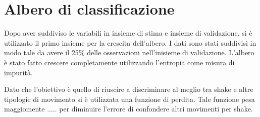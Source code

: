 \documentclass[./main.tex]{subfiles}
\begin{document}
\section{Albero di classificazione}
Dopo aver suddiviso le variabili in insieme di stima e insieme di validazione, si è utilizzato il primo insieme per la crescita dell'albero. I dati sono stati suddivisi in modo tale da avere il 25$\%$ delle osservazioni nell'inisieme di validazione.
L'albero è stato fatto crescere completamente utilizzando l'entropia come misura di impurità. 

Dato che l'obiettivo è quello di riuscire a discriminare al meglio tra shake e altre tipologie di movimento si è utilizzata una funzione di perdita. Tale funzione pesa maggiomente ..... per diminuire l'errore di confondere altri movimenti per shake.


\end{document}

